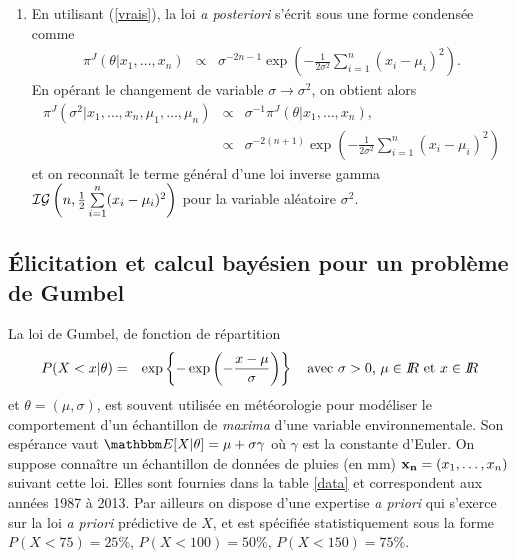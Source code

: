 \begin{enumerate}
\item En utilisant (\ref{vrais}), la loi {\it a posteriori} s'écrit sous une forme condensée comme 
\begin{eqnarray*}
\pi^J(\theta|x_1,\ldots,x_n) & \propto & \sigma^{-2n-1} \exp\left(-\frac{1}{2\sigma^2}\sum\limits_{i=1}^n (x_i-\mu_i)^2\right).
\end{eqnarray*}
En opérant le changement de variable $\sigma \to \sigma^2$, on obtient alors
\begin{eqnarray*}
\pi^J(\sigma^2|x_1,\ldots,x_n,\mu_1,\ldots,\mu_n) & \propto & \sigma^{-1} \pi^J(\theta|x_1,\ldots,x_n), \\
& \propto &  \sigma^{-2(n+1)} \exp\left(-\frac{1}{2\sigma^2}\sum\limits_{i=1}^n (x_i-\mu_i)^2\right)
\end{eqnarray*}
et on reconnaît le terme général  d'une loi inverse gamma ${\cal{IG}}\left(n,\frac{1}{2}\sum\limits_{i=1}^n (x_i-\mu_i)^2\right)$ pour la variable aléatoire $\sigma^2$. 


\end{enumerate}

\subsection{\'Elicitation et calcul bayésien pour un problème de Gumbel}

La loi de Gumbel, de fonction de r\'epartition
\begin{eqnarray*}
P(X<x|\theta) & = & \exp\left\{-\exp\left(-\frac{x-\mu}{\sigma}\right)\right\} \ \ \ \text{avec $\sigma>0$, $\mu\in\R$ et $x\in\R$}
\end{eqnarray*}
et $\theta=(\mu,\sigma)$,  est souvent utilis\'ee en météorologie  pour modéliser le comportement d'un échantillon de {\it maxima} d'une variable environnementale. Son espérance vaut $\E[X|\theta]=\mu + \sigma \gamma$ où $\gamma$ est la constante d'Euler. On suppose connaître un échantillon de données de pluies (en mm) ${\bf x_n}=(x_1,\ldots,x_n)$ suivant cette loi. Elles sont fournies dans la table \ref{data} et correspondent aux années 1987 à 2013. Par ailleurs on dispose d'une expertise {\it a priori} qui s'exerce sur la loi {\it a priori} prédictive de $X$, et est spécifiée statistiquement sous la forme
$P(X<75)=25\%$, $P(X<100)=50\%$, $P(X<150)=75\%$. \\

